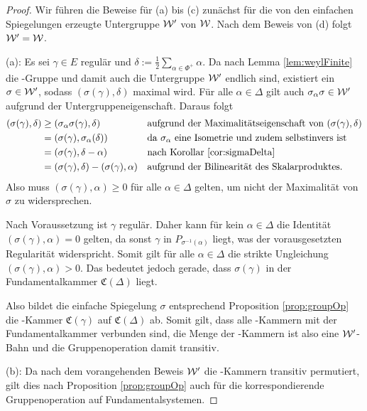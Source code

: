 \begin{proof}
  Wir führen die Beweise für (a) bis (c) zunächst für die von den einfachen Spiegelungen erzeugte Untergruppe $\mathcal{W}'$ von $\mathcal{W}$.
  Nach dem Beweis von (d) folgt $\mathcal{W}' = \mathcal{W}$.

  (a):
  Es sei $\gamma \in E$ regulär und $\delta := \tfrac{1}{2} \sum_{\alpha \in \Phi^+} \alpha$.
  Da nach Lemma \ref{lem:weylFinite} die \weyl\hyp{}Gruppe und damit auch die Untergruppe $\mathcal{W}'$ endlich sind, existiert ein $\sigma \in \mathcal{W}'$, sodass $(\sigma(\gamma), \delta)$ maximal wird.
  Für alle $\alpha \in \Delta$ gilt auch $\sigma_\alpha\sigma \in \mathcal{W}'$ aufgrund der Untergruppeneigenschaft.
  Daraus folgt
  \begin{align*}
    (\sigma(\gamma), \delta) 
    &\geq (\sigma_\alpha \sigma(\gamma), \delta) &&\text{aufgrund der Maximalitätseigenschaft von $(\sigma(\gamma),\delta)$} \\
    &= (\sigma(\gamma), \sigma_\alpha(\delta)) &&\text{da $\sigma_\alpha$ eine Isometrie und zudem selbstinvers ist} \\
    &= (\sigma(\gamma), \delta - \alpha) &&\text{nach Korollar \ref{cor:sigmaDelta}} \\
    &= (\sigma(\gamma), \delta) - (\sigma(\gamma), \alpha) &&\text{aufgrund der Bilinearität des Skalarproduktes.}
  \end{align*}
  Also muss $(\sigma(\gamma), \alpha) \geq 0$ für alle $\alpha \in \Delta$ gelten, um nicht der Maximalität von $\sigma$ zu widersprechen.

  Nach Voraussetzung ist $\gamma$ regulär.
  Daher kann für kein $\alpha \in \Delta$ die Identität $(\sigma(\gamma),\alpha) = 0$ gelten, da sonst $\gamma$ in $P_{\sigma^{-1}(\alpha)}$ liegt, was der vorausgesetzten Regularität widerspricht.
  Somit gilt für alle $\alpha \in \Delta$ die strikte Ungleichung $(\sigma(\gamma), \alpha) > 0$.
  Das bedeutet jedoch gerade, dass $\sigma(\gamma)$ in der Fundamentalkammer $\mathfrak{C}(\Delta)$ liegt.

  Also bildet die einfache Spiegelung $\sigma$ entsprechend Proposition \ref{prop:groupOp} die \weyl\hyp{}Kammer $\mathfrak{C}(\gamma)$ auf $\mathfrak{C}(\Delta)$ ab. 
  Somit gilt, dass alle \weyl\hyp{}Kammern mit der Fundamentalkammer verbunden sind, die Menge der \weyl\hyp{}Kammern ist also eine $\mathcal{W}'$\hyp{}Bahn und die Gruppenoperation damit transitiv.

  (b):
  Da nach dem vorangehenden Beweis $\mathcal{W}'$ die \weyl\hyp{}Kammern transitiv permutiert, gilt dies nach Proposition \ref{prop:groupOp} auch für die korrespondierende Gruppenoperation auf Fundamentalsystemen.


\end{proof}
